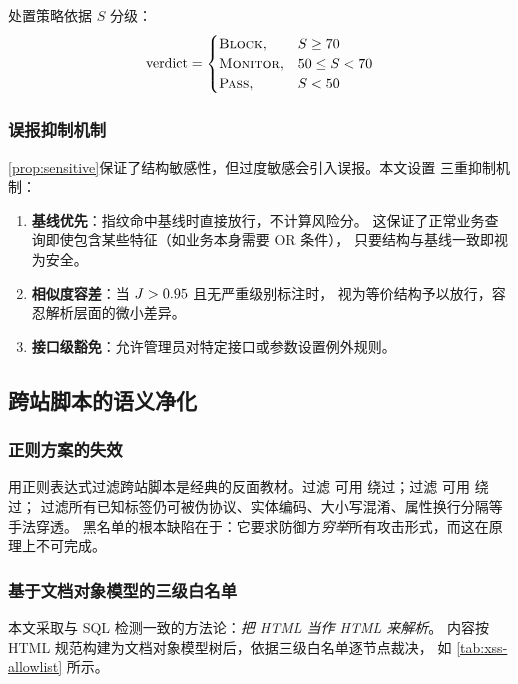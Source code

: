 处置策略依据 $S$ 分级：
\begin{equation}
\text{verdict} =
\begin{cases}
\textsc{Block},   & S \geq 70 \\
\textsc{Monitor}, & 50 \leq S < 70 \\
\textsc{Pass},    & S < 50
\end{cases}
\end{equation}

\subsubsection{误报抑制机制}

\cref{prop:sensitive}保证了结构敏感性，但过度敏感会引入误报。本文设置
三重抑制机制：

\begin{enumerate}
  \item \textbf{基线优先}：指纹命中基线时直接放行，不计算风险分。
        这保证了正常业务查询即使包含某些特征（如业务本身需要 OR 条件），
        只要结构与基线一致即视为安全。
  \item \textbf{相似度容差}：当 $J > 0.95$ 且无严重级别标注时，
        视为等价结构予以放行，容忍解析层面的微小差异。
  \item \textbf{接口级豁免}：允许管理员对特定接口或参数设置例外规则。
\end{enumerate}

\subsection{跨站脚本的语义净化}
\label{subsec:xss}

\subsubsection{正则方案的失效}

用正则表达式过滤跨站脚本是经典的反面教材。过滤  可用
 绕过；过滤  可用  绕过；
过滤所有已知标签仍可被伪协议、实体编码、大小写混淆、属性换行分隔等手法穿透。
黑名单的根本缺陷在于：它要求防御方\emph{穷举}所有攻击形式，而这在原理上不可完成。

\subsubsection{基于文档对象模型的三级白名单}

本文采取与 SQL 检测一致的方法论：\emph{把 HTML 当作 HTML 来解析}。
内容按 HTML 规范构建为文档对象模型树后，依据三级白名单逐节点裁决，
如 \cref{tab:xss-allowlist} 所示。

